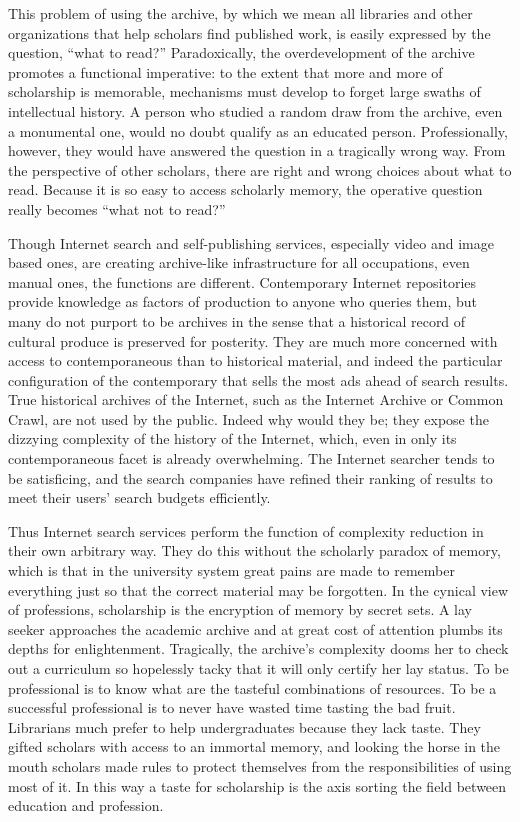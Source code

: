 \documentclass[]{book}
\theoremstyle{definition}
\theoremstyle{definition}
\theoremstyle{definition}
\theoremstyle{remark}
\begin{document}
This problem of using the archive, by which we mean all libraries and
other organizations that help scholars find published work, is easily
expressed by the question, ``what to read?'' Paradoxically, the
overdevelopment of the archive promotes a functional imperative: to the
extent that more and more of scholarship is memorable, mechanisms must
develop to forget large swaths of intellectual history. A person who
studied a random draw from the archive, even a monumental one, would no
doubt qualify as an educated person. Professionally, however, they would
have answered the question in a tragically wrong way. From the
perspective of other scholars, there are right and wrong choices about
what to read. Because it is so easy to access scholarly memory, the
operative question really becomes ``what not to read?''

Though Internet search and self-publishing services, especially video
and image based ones, are creating archive-like infrastructure for all
occupations, even manual ones, the functions are different. Contemporary
Internet repositories provide knowledge as factors of production to
anyone who queries them, but many do not purport to be archives in the
sense that a historical record of cultural produce is preserved for
posterity. They are much more concerned with access to contemporaneous
than to historical material, and indeed the particular configuration of
the contemporary that sells the most ads ahead of search results. True
historical archives of the Internet, such as the Internet Archive or
Common Crawl, are not used by the public. Indeed why would they be; they
expose the dizzying complexity of the history of the Internet, which,
even in only its contemporaneous facet is already overwhelming. The
Internet searcher tends to be satisficing, and the search companies have
refined their ranking of results to meet their users' search budgets
efficiently.

Thus Internet search services perform the function of complexity
reduction in their own arbitrary way. They do this without the scholarly
paradox of memory, which is that in the university system great pains
are made to remember everything just so that the correct material may be
forgotten. In the cynical view of professions, scholarship is the
encryption of memory by secret sets. A lay seeker approaches the
academic archive and at great cost of attention plumbs its depths for
enlightenment. Tragically, the archive's complexity dooms her to check
out a curriculum so hopelessly tacky that it will only certify her lay
status. To be professional is to know what are the tasteful combinations
of resources. To be a successful professional is to never have wasted
time tasting the bad fruit. Librarians much prefer to help
undergraduates because they lack taste. They gifted scholars with access
to an immortal memory, and looking the horse in the mouth scholars made
rules to protect themselves from the responsibilities of using most of
it. In this way a taste for scholarship is the axis sorting the field
between education and profession.
\end{document}
